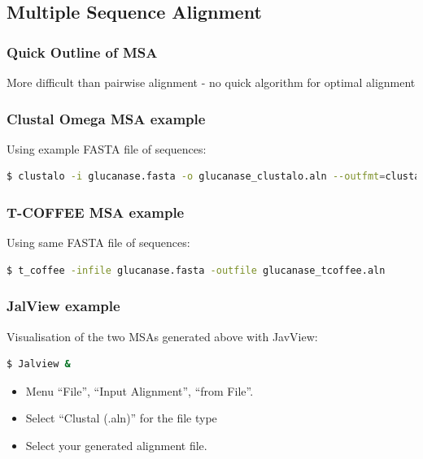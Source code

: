 \documentclass[table]{beamer}
\begin{document}
\subsection{Multiple Sequence Alignment}

\begin{frame}
\frametitle{Quick Outline of MSA}
More difficult than pairwise alignment - no quick algorithm for optimal alignment
\end{frame}

\begin{frame}[fragile]
\frametitle{Clustal Omega MSA example}
Using example FASTA file of sequences:
\begin{lstlisting}[language=bash]
$ clustalo -i glucanase.fasta -o glucanase_clustalo.aln --outfmt=clustal
\end{lstlisting}
\end{frame}

\begin{frame}[fragile]
\frametitle{T-COFFEE MSA example}
Using same FASTA file of sequences:
\begin{lstlisting}[language=bash]
$ t_coffee -infile glucanase.fasta -outfile glucanase_tcoffee.aln
\end{lstlisting}
\end{frame}

\begin{frame}[fragile]
\frametitle{JalView example}
Visualisation of the two MSAs generated above with JavView:
\begin{lstlisting}[language=bash]
$ Jalview &
\end{lstlisting}
\begin{itemize}
\item Menu ``File'', ``Input Alignment'', ``from File''.
\item Select ``Clustal (.aln)'' for the file type
\item Select your generated alignment file.
\end{itemize}
\end{frame}
\end{document}
